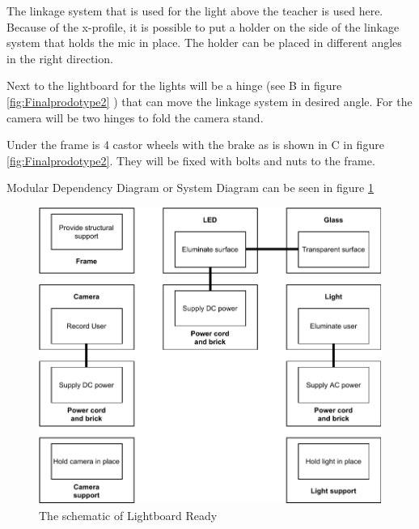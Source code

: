 \documentclass[a4paper]{jpconf}
\begin{document}
\textbf{} The linkage system that is used for the light above the teacher is used here.
Because of the x-profile, it is possible to put a holder on the side of the linkage system that holds the mic in place.
The holder can be placed in different angles in the right direction.

\textbf{} Next to the lightboard for the lights will be a hinge (see B in figure \ref{fig:Finalprodotype2} ) that can move the linkage system in desired angle.
For the camera will be two hinges to fold the camera stand.

\textbf{} Under the frame is 4 castor wheels with the brake as is shown in C in figure \ref{fig:Finalprodotype2}.
They will be fixed with bolts and nuts to the frame.

Modular Dependency Diagram or System Diagram can be seen in figure \ref{fig:scematic}
\begin{figure}
	\centering
	\includegraphics[width=0.7\linewidth]{scematic.pdf}
	\caption{The schematic of Lightboard Ready}
	\label{fig:scematic}
\end{figure}
\end{document}
